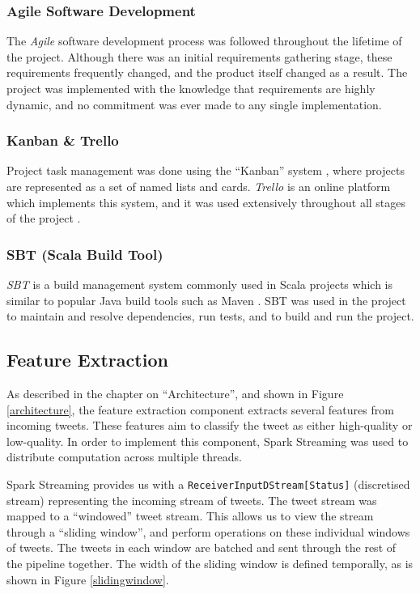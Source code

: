\documentclass{l4proj}
\newcommand{\code}[1]{\texttt{#1}}
\begin{document}
             \subsubsection{Agile Software Development}
             The \textit{Agile} software development process was followed throughout the lifetime of the project. Although there was an initial requirements gathering stage, these requirements frequently changed, and the product itself changed as a result. The project was implemented with the knowledge that requirements are highly dynamic, and no commitment was ever made to any single implementation.
             
             \subsubsection{Kanban \& Trello}
             Project task management was done using the ``Kanban'' system \cite{kanban}, where projects are represented as a set of named lists and cards. \textit{Trello} is an online platform which implements this system, and it was used extensively throughout all stages of the project \cite{trello}.
         
             \subsubsection{SBT (Scala Build Tool)}
         \textit{SBT} is a build management system commonly used in Scala projects \cite{sbt} which is similar to popular Java build tools such as Maven \cite{maven}. SBT was used in the project to maintain and resolve dependencies, run tests, and to build and run the project.

    
    
    \subsection{Feature Extraction}
        
        As described in the chapter on ``Architecture'', and shown in Figure \ref{architecture}, the feature extraction component extracts several features from incoming tweets. These features aim to classify the tweet as either high-quality or low-quality. In order to implement this component, Spark Streaming was used to distribute computation across multiple threads.
        
        Spark Streaming provides us with a \code{ReceiverInputDStream[Status]} (discretised stream) representing the incoming stream of tweets. The tweet stream was mapped to a ``windowed'' tweet stream. This allows us to view the stream through a ``sliding window'', and perform operations on these individual windows of tweets. The tweets in each window are batched and sent through the rest of the pipeline together. The width of the sliding window is defined temporally, as is shown in Figure \ref{slidingwindow}.
        
\end{document}
